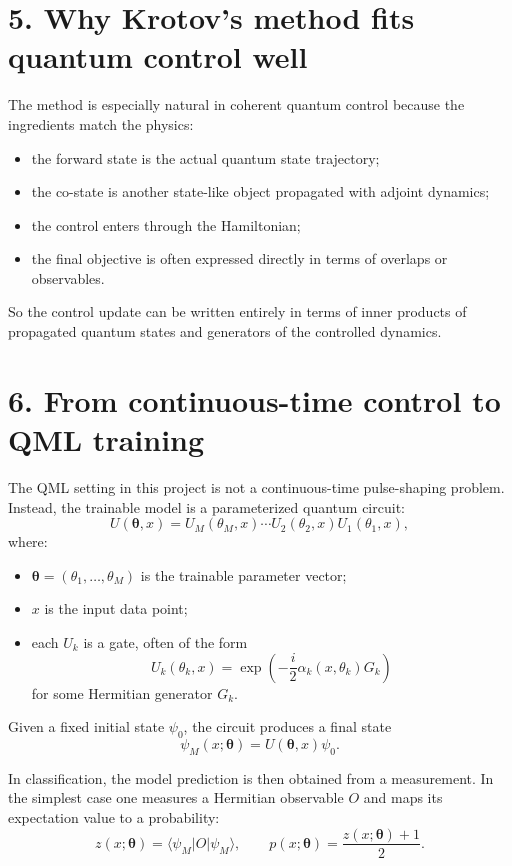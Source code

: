\documentclass[11pt]{article}
\begin{document}
\section*{5. Why Krotov's method fits quantum control well}
The method is especially natural in coherent quantum control because the ingredients match the physics:
\begin{itemize}
\item the forward state is the actual quantum state trajectory;
\item the co-state is another state-like object propagated with adjoint dynamics;
\item the control enters through the Hamiltonian;
\item the final objective is often expressed directly in terms of overlaps or observables.
\end{itemize}

So the control update can be written entirely in terms of inner products of propagated quantum states and generators of the controlled dynamics.

\section*{6. From continuous-time control to QML training}
The QML setting in this project is not a continuous-time pulse-shaping problem. Instead, the trainable model is a parameterized quantum circuit:
\begin{equation}
U(\bm{\theta},x)
=
U_M(\theta_M,x)\cdots U_2(\theta_2,x)U_1(\theta_1,x),
\end{equation}
where:
\begin{itemize}
\item $\bm{\theta}=(\theta_1,\dots,\theta_M)$ is the trainable parameter vector;
\item $x$ is the input data point;
\item each $U_k$ is a gate, often of the form
\begin{equation}
U_k(\theta_k,x)=\exp\!\left(-\frac{i}{2}\alpha_k(x,\theta_k)G_k\right)
\end{equation}
for some Hermitian generator $G_k$.
\end{itemize}

Given a fixed initial state $\psi_0$, the circuit produces a final state
\begin{equation}
\psi_M(x;\bm{\theta}) = U(\bm{\theta},x)\psi_0.
\end{equation}

In classification, the model prediction is then obtained from a measurement. In the simplest case one measures a Hermitian observable $O$ and maps its expectation value to a probability:
\begin{equation}
z(x;\bm{\theta}) = \langle \psi_M | O | \psi_M \rangle,
\qquad
p(x;\bm{\theta}) = \frac{z(x;\bm{\theta})+1}{2}.
\label{eq:simple_readout}
\end{equation}
\end{document}
